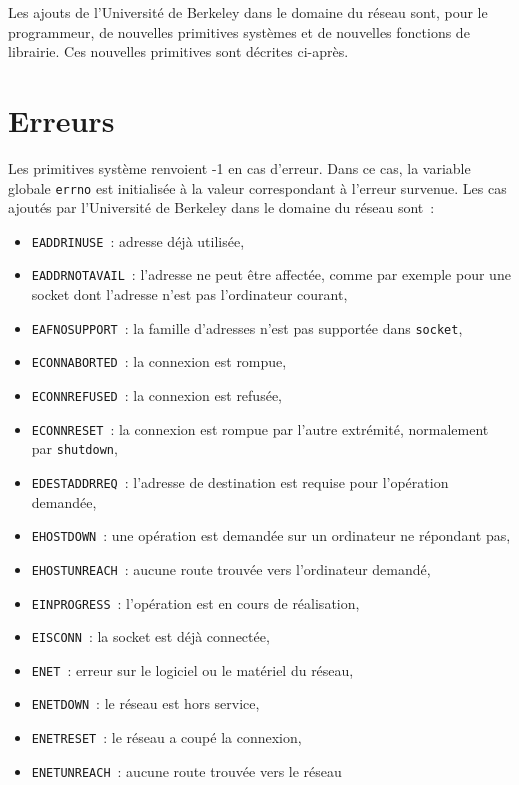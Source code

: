 \documentclass [twoside] {report}
\begin{document}
Les ajouts de l'Université de Berkeley dans le domaine du
réseau sont, pour le programmeur, de nouvelles primitives
systèmes et de nouvelles fonctions de librairie. Ces nouvelles
primitives sont décrites ci-après.

\section* {Erreurs}

Les primitives système renvoient -1 en cas d'erreur. Dans ce
cas, la variable globale \texttt {errno} est initialisée à la
valeur correspondant à l'erreur survenue. Les cas ajoutés
par l'Université de Berkeley dans le domaine du réseau sont~:

\begin {itemize}
    \item \texttt {EADDRINUSE}~: adresse déjà utilisée,
    \item \texttt {EADDRNOTAVAIL}~: l'adresse ne peut être affectée, comme
	par exemple pour une socket dont l'adresse n'est
	pas l'ordinateur courant,
    \item \texttt {EAFNOSUPPORT}~: la famille d'adresses n'est pas supportée
	dans \texttt {socket},
    \item \texttt {ECONNABORTED}~: la connexion est rompue,
    \item \texttt {ECONNREFUSED}~: la connexion est refusée,
    \item \texttt {ECONNRESET}~: la connexion est rompue par l'autre
	extrémité, normalement par \texttt {shutdown},
    \item \texttt {EDESTADDRREQ}~: l'adresse de destination est requise pour
	l'opération demandée,
    \item \texttt {EHOSTDOWN}~: une opération est demandée sur un ordinateur
	ne répondant pas,
    \item \texttt {EHOSTUNREACH}~: aucune route trouvée vers l'ordinateur
	demandé,
    \item \texttt {EINPROGRESS}~: l'opération est en cours de réalisation,
    \item \texttt {EISCONN}~: la socket est déjà connectée,
    \item \texttt {ENET}~: erreur sur le logiciel ou le matériel du réseau,
    \item \texttt {ENETDOWN}~: le réseau est hors service,
    \item \texttt {ENETRESET}~: le réseau a coupé la connexion,
    \item \texttt {ENETUNREACH}~: aucune route trouvée vers le réseau

\end{itemize}
\end{document}
